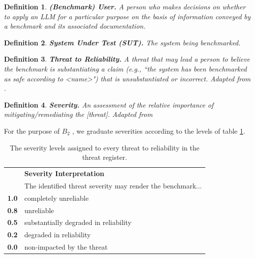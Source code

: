\documentclass{article}
\newtheorem{dfn}{Definition}[section]
\newcommand\bb{$B_2$ }
\begin{document}
\begin{dfn}
{\bf (Benchmark) User.} A person who makes decisions on whether to apply an LLM for a particular purpose on the basis of information conveyed by a benchmark and its associated documentation.
\end{dfn}
\begin{dfn}
{\bf System Under Test (SUT).} The system being benchmarked.
\end{dfn}
\begin{dfn}
{\bf Threat to Reliability.} A threat that may lead a person to believe the benchmark is substantiating a claim (e.g., ``the system has been benchmarked as safe according to <name>") that is unsubstantiated or incorrect. Adapted from \cite{cnssi4009}.
\end{dfn}
\begin{dfn}
{\bf Severity.} An assessment of the relative importance of mitigating/remediating the [threat]. Adapted from \cite{nist80030r1}
\end{dfn}

For the purpose of \bb, we graduate severities according to the levels of table \ref{tab:severity}.
\begin{table}[!ht]
  \caption{The severity levels assigned to every threat to reliability in the threat register.}
\label{tab:severity}
  \centering
  \begin{tabular}{lp{10cm}}
    \toprule
    & \textbf{Severity Interpretation} \\
    & The identified threat severity may render the benchmark... \\
    \midrule
    \textbf{1.0} & completely unreliable \\
    \textbf{0.8} & unreliable \\
    \textbf{0.5} & substantially degraded in reliability  \\
    \textbf{0.2} & degraded in reliability \\
    \textbf{0.0} & non-impacted by the threat \\
    \bottomrule
  \end{tabular}
\end{table}
\end{document}
